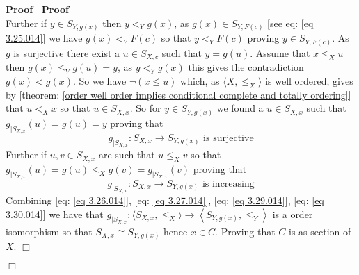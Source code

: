 \documentclass{book}
\newenvironment{proof}{\noindent\textbf{Proof\ }}{\hspace*{\fill}$\Box$\medskip}
\begin{document}
\begin{proof}
\begin{proof}
\begin{equation}
    \end{equation}
    Further if $y \in S_{Y, g (x)}$ then $y <_Y g (x)$, as $g (x) \in S_{Y, F
    (c)}$ [see eq: \ref{eq 3.25.014}] we have $g (x) <_Y F (c)$ so that $y <_Y
    F (c)$ proving $y \in S_{Y, F (c)}$. As $g$ is surjective there exist a $u
    \in S_{X, c}$ such that $y = g (u)$. Assume that $x \leqslant_X u$ then $g
    (x) \leqslant_Y g (u) = y$, as $y <_Y g (x)$ this gives the contradiction
    $g (x) < g (x)$. So we have $\neg (x \leqslant u)$ which, as $\langle X,
    \leqslant_X \rangle$ is well ordered, gives by [theorem: \ref{order well
    order implies conditional complete and totally ordering}] that $u <_X x$
    so that $u \in S_{X, x}$. So for $y \in S_{Y, g (x)}$ we found a $u \in
    S_{X, x}$ such that $g_{|S_{X, x}} (u) = g (u) = y$ proving that
    \begin{equation}
      \label{eq 3.29.014} g_{|S_{X, x}} : S_{X, x} \rightarrow S_{Y, g (x)}
      \text{ is surjective}
    \end{equation}
    Further if $u, v \in S_{X, x}$ are such that $u \leqslant_X v$ so that
    $g_{|S_{X, x}} (u) = g (u) \leqslant_X g (v) = g_{|S_{X, x}} (v)$ proving
    that
    \begin{equation}
      \label{eq 3.30.014} g_{|S_{X, x}} : S_{X, x} \rightarrow S_{Y, g (x)}
      \text{ is increasing}
    \end{equation}
    Combining [eq: \ref{eq 3.26.014}], [eq: \ref{eq 3.27.014}], [eq: \ref{eq
    3.29.014}], [eq: \ref{eq 3.30.014}] we have that $g_{|S_{X, x}} : \langle
    S_{X, x}, \leqslant_X \rangle \rightarrow \left\langle {S_{Y, g (x)}} ,
    \leqslant_Y \right\rangle$ is a order isomorphism so that $S_{X, x} \cong
    S_{Y, g (x)}$ hence $x \in C$. Proving that $C$ is as section of $X$.
  \end{proof}
  

\end{proof}
\end{document}
